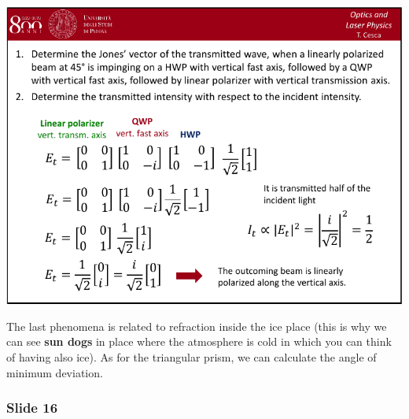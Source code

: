 \documentclass[../main/main.tex]{subfiles}
\begin{document}
\begin{minipage}[]{0.5\linewidth}
\centering
\includegraphics[page=15,width=1\textwidth]{../lessons/pdf_file/04_lecture.pdf}
\end{minipage}
\hspace{0.3cm}\vspace{0.3cm}
\begin{minipage}[c]{0.47\linewidth}

The last phenomena is related to refraction inside the ice place (this is why we can see \textbf{sun dogs} in place where the atmosphere is cold in which you can think of having also ice). As for the triangular prism, we can calculate the angle of minimum deviation.

\end{minipage}

\subsubsection*{Slide 16}
\end{document}
